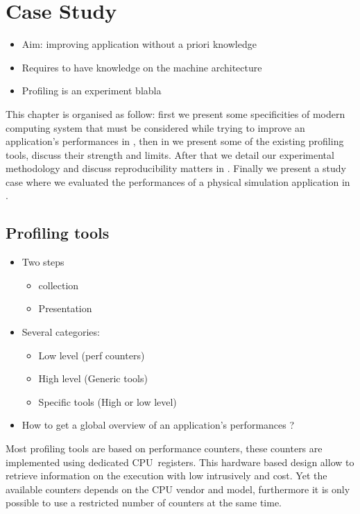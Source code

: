 \chapter{Case Study}
\label{chap:perf}

\begin{itemize}
    \item Aim: improving application without a priori knowledge
    \item Requires to have knowledge on the  machine architecture
    \item Profiling is an experiment blabla
\end{itemize}

This chapter is organised as follow: first we present some specificities of
modern computing system that must be considered while trying to improve an
application's performances in , then in  we
present some of the existing profiling tools, discuss their strength and
limits. After that we detail our experimental methodology and discuss
reproducibility matters in . Finally we present a study
case where we evaluated the performances of a physical simulation application
in .

\section{Profiling tools}
\label{sec:prof-tools}


\begin{itemize}
    \item Two steps
        \begin{itemize}
            \item collection
            \item Presentation
        \end{itemize}
    \item Several categories:
        \begin{itemize}
            \item Low level (perf counters)
            \item High level (Generic tools)
            \item Specific tools (High or low level)
        \end{itemize}
    \item How to get a global overview of an application's performances ?
\end{itemize}

Most profiling tools are based on performance counters, these counters are
implemented using dedicated \gls{CPU} registers. This hardware based design
allow to retrieve information on the execution with low intrusively and cost.
Yet the available counters depends on the \gls{CPU} vendor and model,
furthermore it is only possible to use a restricted number of counters at
the same time.

